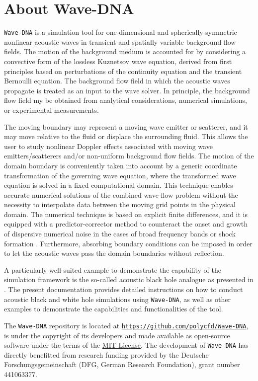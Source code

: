 \chapter{About Wave-DNA}
\label{chap:About Wave-DNA}

{\tt Wave-DNA} is a simulation tool for one-dimensional and spherically-symmetric nonlinear acoustic waves in transient and spatially variable background flow fields. The motion of the background medium is accounted for by considering a convective form of the lossless Kuznetsov wave equation, derived from first principles based on perturbations of the continuity equation and the transient Bernoulli equation. The background flow field in which the acoustic waves propagate is treated as an input to the wave solver. In principle, the background flow field my be obtained from analytical considerations, numerical simulations, or experimental measurements.

The moving boundary may represent a moving wave emitter or scatterer, and it may move relative to the fluid or displace the surrounding fluid. This allows the user to study nonlinear Doppler effects associated with moving wave emitters/scatterers and/or non-uniform background flow fields. The motion of the domain boundary is conveniently taken into account by a generic coordinate transformation of the governing wave equation, where the transformed wave equation is solved in a fixed computational domain. This technique enables accurate numerical solutions of the combined wave-flow problem without the necessity to interpolate data between the moving grid points in the physical domain. The numerical technique is based on explicit finite differences, and it is equipped with a predictor-corrector method to counteract the onset and growth of dispersive numerical noise in the cases of broad frequency bands or shock formation \citep{Schenke_et_al_2022}. Furthermore, absorbing boundary conditions can be imposed in order to let the acoustic waves pass the domain boundaries without reflection.

A particularly well-suited example to demonstrate the capability of the simulation framework is the so-called acoustic black hole analogue as presented in \citep{Schenke_et_al_2022_PoF}. The present documentation provides detailed instructions on how to conduct acoustic black and white hole simulations using {\tt Wave-DNA}, as well as other examples to demonstrate the capabilities and functionalities of the tool.

The {\tt Wave-DNA} repository is located at \href{https://github.com/polycfd/Wave-DNA}{\texttt{https://github.com/polycfd/Wave-DNA}}, is under the copyright of its developers and made available as open-source software under the terms of the \href{https://opensource.org/license/mit/}{MIT License}. The development of {\tt Wave-DNA} has directly benefitted from research funding provided by the Deutsche Forschungsgemeinschaft (DFG, German Research Foundation), grant number 441063377.


